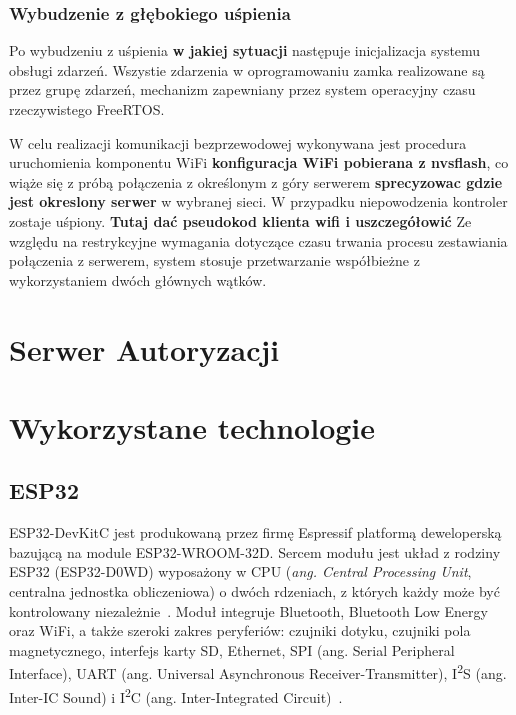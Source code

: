         \subsubsection{Wybudzenie z głębokiego uśpienia}

            Po wybudzeniu z uśpienia \textbf{w jakiej sytuacji} następuje inicjalizacja systemu obsługi zdarzeń. Wszystie zdarzenia w oprogramowaniu zamka realizowane są przez grupę zdarzeń, mechanizm zapewniany przez system operacyjny czasu rzeczywistego FreeRTOS.

            W celu realizacji komunikacji bezprzewodowej wykonywana jest procedura uruchomienia komponentu WiFi \textbf{konfiguracja WiFi pobierana z nvsflash}, co wiąże się z próbą połączenia z określonym z góry serwerem \textbf{sprecyzowac gdzie jest okreslony serwer} w wybranej sieci. W przypadku niepowodzenia kontroler zostaje uśpiony. \textbf{Tutaj dać pseudokod klienta wifi i uszczegółowić}
            Ze względu na restrykcyjne wymagania dotyczące czasu trwania procesu zestawiania połączenia z serwerem, system stosuje przetwarzanie współbieżne z wykorzystaniem dwóch głównych wątków.

\section{Serwer Autoryzacji}

\section {Wykorzystane technologie}

    \subsection{ESP32}
        ESP32-DevKitC jest produkowaną przez firmę Espressif platformą deweloperską bazującą na module ESP32-WROOM-32D. Sercem modułu jest układ z rodziny ESP32 (ESP32-D0WD) wyposażony w CPU (\textit{ang. Central Processing Unit}, centralna jednostka obliczeniowa) o dwóch rdzeniach, z których każdy może być kontrolowany niezależnie~\cite{esp32-wroom32-ds}. Moduł integruje Bluetooth, Bluetooth Low Energy oraz WiFi, a także szeroki zakres peryferiów: czujniki dotyku, czujniki pola magnetycznego, interfejs karty SD, Ethernet, SPI (ang. Serial Peripheral Interface), UART (ang. Universal Asynchronous Receiver-Transmitter), I\textsuperscript{2}S (ang. Inter-IC Sound) i I\textsuperscript{2}C (ang. Inter-Integrated Circuit)~\cite{esp32-wroom32-ds}.

